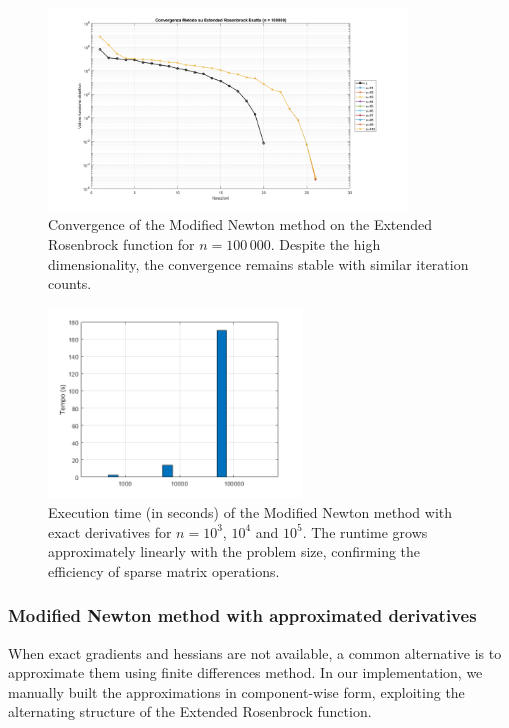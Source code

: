 \documentclass[a4paper,12pt]{article}
\begin{document}
	\begin{figure}[H]%
		\centering
		\includegraphics[width=0.85\textwidth]{../immagini/ext_100k.png}
		\caption{Convergence of the Modified Newton method on the Extended Rosenbrock function for $n=100\,000$. Despite the high dimensionality, the convergence remains stable with similar iteration counts.}
		\label{fig:extnewton_100k}
	\end{figure}
	
	\begin{figure}[H]%
		\centering
		\includegraphics[width=0.6\textwidth]{../immagini/ext_time.png}
		\caption{Execution time (in seconds) of the Modified Newton method with exact derivatives for $n=10^3$, $10^4$ and $10^5$. The runtime grows approximately linearly with the problem size, confirming the efficiency of sparse matrix operations.}
		\label{fig:extnewton_times}
	\end{figure}
	
	\subsubsection{Modified Newton method with approximated derivatives}
	When exact gradients and hessians are not available, a common alternative is to approximate them using finite differences method. In our implementation, we manually built
	the approximations in component-wise form, exploiting the alternating structure of the Extended Rosenbrock function.
\end{document}
